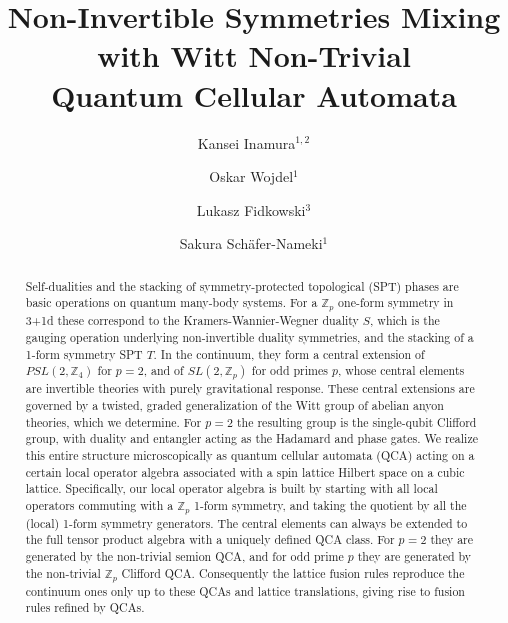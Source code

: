 \documentclass[aps,twocolumn,prx,floatfix,preprintnumbers, nofootinbib,10pt]{revtex4-2}
\numberwithin{equation}{section}
\theoremstyle{definition}
\theoremstyle{remark}
\theoremstyle{claim}
\begin{document}
\title{
Non-Invertible Symmetries Mixing with Witt Non-Trivial \\
Quantum Cellular Automata
}

\author{Kansei Inamura$^{1,2}$}
\author{Oskar Wojdel$^1$}
\author{Lukasz Fidkowski$^{3}$}
\author{Sakura Sch\"afer-Nameki$^{1}$}






\begin{abstract}
\noindent 
Self-dualities  and the stacking of symmetry-protected topological (SPT) phases are basic operations on quantum many-body systems. For a $\mathbb{Z}_p$ one-form symmetry in 3+1d these correspond to the Kramers-Wannier-Wegner duality $S$, which is  the gauging operation underlying non-invertible duality symmetries, and the stacking of a 1-form symmetry SPT $T$. In the continuum, they form a central extension of $PSL(2,\mathbb{Z}_4)$ for $p=2$, and of $SL(2,\mathbb{Z}_p)$ for odd primes $p$, whose central elements are invertible theories with purely gravitational response. These central extensions are governed by a twisted, graded generalization of the Witt group of abelian anyon theories, which we determine. For $p=2$ the resulting group is the single-qubit Clifford group, with duality and entangler acting as the Hadamard and phase gates. 
We realize this entire structure microscopically as quantum cellular automata (QCA) acting on a certain local operator algebra associated with a spin lattice Hilbert space on a cubic lattice.  Specifically, our local operator algebra is built by starting with all local operators commuting with a $\mathbb{Z}_p$ 1-form symmetry, and taking the quotient by all the (local) 1-form symmetry generators.
The central elements can always be extended to the full tensor product algebra with a uniquely defined QCA class. 
For $p=2$ they are generated by the non-trivial semion QCA, and for odd prime $p$ they are generated by the non-trivial $\mathbb{Z}_p$ Clifford QCA. 
Consequently the lattice fusion rules reproduce the continuum ones only up to these QCAs and lattice translations, giving rise to fusion rules refined by QCAs.



\end{abstract}
\end{document}
